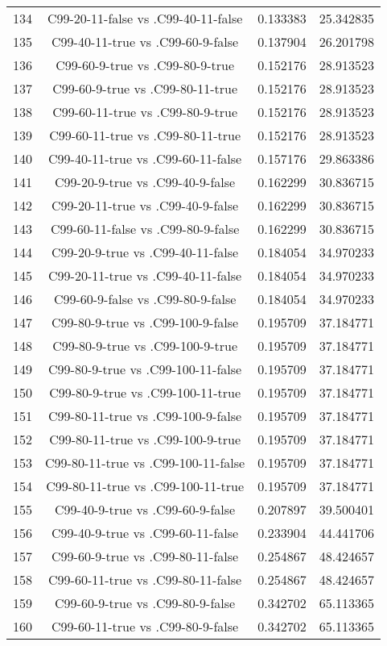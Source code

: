\documentclass[a4paper,10pt]{article}
\begin{document}
\begin{landscape}
\begin{table}[!htp]
\begin{tabular}{cccc}
134&C99-20-11-false vs .C99-40-11-false&0.133383&25.342835\\
135&C99-40-11-true vs .C99-60-9-false&0.137904&26.201798\\
136&C99-60-9-true vs .C99-80-9-true&0.152176&28.913523\\
137&C99-60-9-true vs .C99-80-11-true&0.152176&28.913523\\
138&C99-60-11-true vs .C99-80-9-true&0.152176&28.913523\\
139&C99-60-11-true vs .C99-80-11-true&0.152176&28.913523\\
140&C99-40-11-true vs .C99-60-11-false&0.157176&29.863386\\
141&C99-20-9-true vs .C99-40-9-false&0.162299&30.836715\\
142&C99-20-11-true vs .C99-40-9-false&0.162299&30.836715\\
143&C99-60-11-false vs .C99-80-9-false&0.162299&30.836715\\
144&C99-20-9-true vs .C99-40-11-false&0.184054&34.970233\\
145&C99-20-11-true vs .C99-40-11-false&0.184054&34.970233\\
146&C99-60-9-false vs .C99-80-9-false&0.184054&34.970233\\
147&C99-80-9-true vs .C99-100-9-false&0.195709&37.184771\\
148&C99-80-9-true vs .C99-100-9-true&0.195709&37.184771\\
149&C99-80-9-true vs .C99-100-11-false&0.195709&37.184771\\
150&C99-80-9-true vs .C99-100-11-true&0.195709&37.184771\\
151&C99-80-11-true vs .C99-100-9-false&0.195709&37.184771\\
152&C99-80-11-true vs .C99-100-9-true&0.195709&37.184771\\
153&C99-80-11-true vs .C99-100-11-false&0.195709&37.184771\\
154&C99-80-11-true vs .C99-100-11-true&0.195709&37.184771\\
155&C99-40-9-true vs .C99-60-9-false&0.207897&39.500401\\
156&C99-40-9-true vs .C99-60-11-false&0.233904&44.441706\\
157&C99-60-9-true vs .C99-80-11-false&0.254867&48.424657\\
158&C99-60-11-true vs .C99-80-11-false&0.254867&48.424657\\
159&C99-60-9-true vs .C99-80-9-false&0.342702&65.113365\\
160&C99-60-11-true vs .C99-80-9-false&0.342702&65.113365\\

\end{tabular}
\end{table}
\end{landscape}
\end{document}
